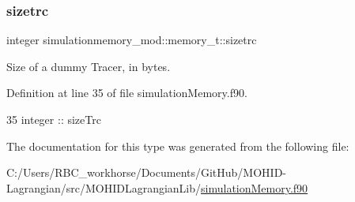 \subsubsection{\texorpdfstring{sizetrc}{sizetrc}}
{\footnotesize\ttfamily integer simulationmemory\+\_\+mod\+::memory\+\_\+t\+::sizetrc\hspace{0.3cm}{\ttfamily [private]}}



Size of a dummy Tracer, in bytes. 



Definition at line 35 of file simulation\+Memory.\+f90.


\begin{DoxyCode}
35         \textcolor{keywordtype}{integer} :: sizeTrc
\end{DoxyCode}


The documentation for this type was generated from the following file\+:\begin{DoxyCompactItemize}
\item 
C\+:/\+Users/\+R\+B\+C\+\_\+workhorse/\+Documents/\+Git\+Hub/\+M\+O\+H\+I\+D-\/\+Lagrangian/src/\+M\+O\+H\+I\+D\+Lagrangian\+Lib/\mbox{\hyperlink{simulation_memory_8f90}{simulation\+Memory.\+f90}}\end{DoxyCompactItemize}
